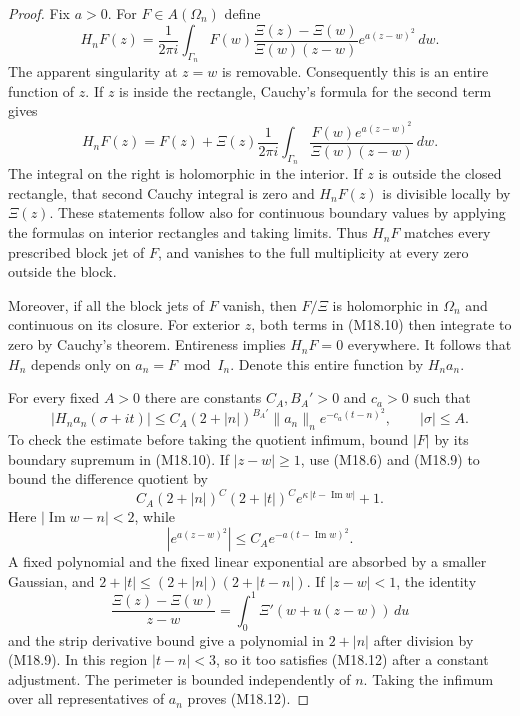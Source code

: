 \begin{proof}
Fix \(a>0\).  For \(F\in A(\Omega_n)\) define
\[
 H_nF(z)=\frac1{2\pi i}\int_{\Gamma_n}
    F(w)\frac{\Xi(z)-\Xi(w)}{\Xi(w)(z-w)}
                      e^{a(z-w)^2}\,dw .                       \tag{M18.10}
\]
The apparent singularity at \(z=w\) is removable.
Consequently this is an entire function of \(z\).
If \(z\) is inside the rectangle, Cauchy's formula
for the second term gives
\[
 H_nF(z)=F(z)+\Xi(z)\frac1{2\pi i}
             \int_{\Gamma_n}
               \frac{F(w)e^{a(z-w)^2}}{\Xi(w)(z-w)}\,dw .
                                                                  \tag{M18.11}
\]
The integral on the right is holomorphic in the interior.
If \(z\) is outside the closed rectangle, that second
Cauchy integral is zero and \(H_nF(z)\) is divisible
locally by \(\Xi(z)\).
These statements follow also for continuous boundary
values by applying the formulas on interior rectangles
and taking limits.  Thus \(H_nF\) matches every
prescribed block jet of \(F\), and vanishes to the
full multiplicity at every zero outside the block.

Moreover, if all the block jets of \(F\) vanish, then
\(F/\Xi\) is holomorphic in \(\Omega_n\) and continuous
on its closure.  For exterior \(z\), both terms in
(M18.10) then integrate to zero by Cauchy's theorem.
Entireness implies \(H_nF=0\) everywhere.  It follows
that \(H_n\) depends only on \(a_n=F\bmod I_n\).
Denote this entire function by \(H_n a_n\).

For every fixed \(A>0\) there are constants \(C_A,B_A'>0\)
and \(c_a>0\) such that
\[
 |H_n a_n(\sigma+it)|
       \le C_A(2+|n|)^{B_A'}\|a_n\|_n
                         e^{-c_a(t-n)^2},
                 \qquad |\sigma|\le A.                         \tag{M18.12}
\]
To check the estimate before taking the quotient infimum,
bound \(|F|\) by its boundary supremum in (M18.10).
If \(|z-w|\ge1\), use (M18.6) and (M18.9) to bound
the difference quotient by
\[
 C_A(2+|n|)^C(2+|t|)^C
                    e^{\kappa\,\lvert t-\operatorname{Im}w\rvert}
       +1 .
\]
Here \(|\operatorname{Im}w-n|<2\), while
\[
 |e^{a(z-w)^2}|
       \le C_A e^{-a(t-\operatorname{Im}w)^2}.
\]
A fixed polynomial and the fixed linear exponential
are absorbed by a smaller Gaussian, and
\(2+|t|\le(2+|n|)(2+|t-n|)\).
If \(|z-w|<1\), the identity
\[
 \frac{\Xi(z)-\Xi(w)}{z-w}
      =\int_0^1\Xi'(w+u(z-w))\,du
\]
and the strip derivative bound give a polynomial in
\(2+|n|\) after division by (M18.9).
In this region \(|t-n|<3\), so it too satisfies (M18.12)
after a constant adjustment.  The perimeter is bounded
independently of \(n\).  Taking the infimum over all
representatives of \(a_n\) proves (M18.12).


\end{proof}
